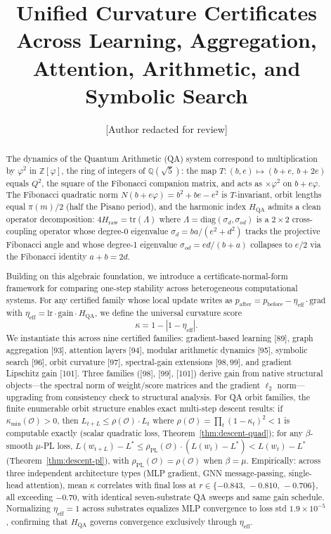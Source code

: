 \documentclass[11pt]{article}
\title{\textbf{Unified Curvature Certificates Across Learning, Aggregation,\\
Attention, Arithmetic, and Symbolic Search}}
\author{[Author redacted for review]}
\date{}
\theoremstyle{definition}
\theoremstyle{remark}
\newcommand{\hqa}{H_{\mathrm{QA}}}
\newcommand{\hraw}{H_{\mathrm{raw}}}
\newcommand{\etaeff}{\eta_{\mathrm{eff}}}
\newcommand{\kmin}{\kappa_{\min}}
\newcommand{\rhoO}{\rho(\mathcal{O})}
\newcommand{\rhoPL}{\rho_{\mathrm{PL}}(\mathcal{O})}
\newcommand{\Zfi}{\mathbb{Z}[\varphi]}
\newcommand{\Qfi}{\mathbb{Q}(\sqrt{5})}
\begin{document}
\maketitle

\begin{abstract}
The dynamics of the Quantum Arithmetic (QA) system correspond to multiplication
by $\varphi^2$ in $\Zfi$, the ring of integers of $\Qfi$: the map
$T:(b,e)\mapsto(b{+}e,\,b{+}2e)$ equals $Q^2$, the square of the Fibonacci
companion matrix, and acts as ${\times}\varphi^2$ on $b+e\varphi$. The Fibonacci
quadratic norm $N(b+e\varphi)=b^2+be-e^2$ is $T$-invariant, orbit lengths equal
$\pi(m)/2$ (half the Pisano period), and the harmonic index $\hqa$ admits a clean
operator decomposition: $4\hraw=\mathrm{tr}(\Lambda)$ where
$\Lambda=\mathrm{diag}(\sigma_d,\sigma_{od})$ is a $2\times 2$ cross-coupling
operator whose degree-0 eigenvalue $\sigma_d=ba/(e^2+d^2)$ tracks the projective
Fibonacci angle and whose degree-1 eigenvalue $\sigma_{od}=ed/(b+a)$ collapses to
$e/2$ via the Fibonacci identity $a+b=2d$.

Building on this algebraic foundation, we introduce a certificate-normal-form
framework for comparing one-step stability across heterogeneous computational systems.
For any certified family whose local update writes as
$p_{\mathrm{after}}=p_{\mathrm{before}}-\etaeff\cdot\mathrm{grad}$ with
$\etaeff=\mathrm{lr}\cdot\mathrm{gain}\cdot\hqa$, we define the universal
curvature score
\[
  \kappa = 1 - |1-\etaeff|.
\]
We instantiate this across nine certified families: gradient-based learning [89],
graph aggregation [93], attention layers [94], modular arithmetic dynamics [95],
symbolic search [96], orbit curvature [97], spectral-gain extensions [98,\,99],
and gradient Lipschitz gain [101]. Three families ([98], [99], [101]) derive gain
from native structural objects---the spectral norm of weight/score matrices and the
gradient $\ell_2$ norm---upgrading from consistency check to structural analysis.
For QA orbit families, the finite enumerable orbit structure enables exact multi-step
descent results: if $\kmin(\mathcal{O})>0$, then
$L_{t+L}\leq\rhoO\cdot L_t$ where $\rhoO=\prod_t(1-\kappa_t)^2<1$ is computable
exactly (scalar quadratic loss, Theorem~\ref{thm:descent-quad}); for any
$\beta$-smooth $\mu$-PL loss,
$L(w_{t+L})-L^*\leq\rhoPL\cdot(L(w_t)-L^*)<L(w_t)-L^*$
(Theorem~\ref{thm:descent-pl}), with $\rhoPL=\rhoO$ when $\beta=\mu$.
Empirically: across three independent architecture types (MLP gradient, GNN
message-passing, single-head attention), mean $\kappa$ correlates with final loss at
$r\in\{-0.843,\,-0.810,\,-0.706\}$, all exceeding $-0.70$, with identical
seven-substrate QA sweeps and same gain schedule. Normalizing $\etaeff=1$ across
substrates equalizes MLP convergence to loss std $1.9\times10^{-5}$, confirming that
$\hqa$ governs convergence exclusively through $\etaeff$.
\end{abstract}
\end{document}
